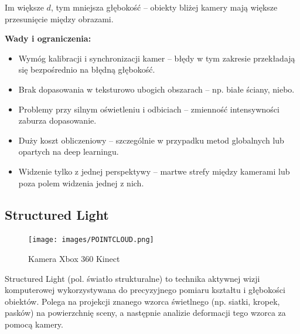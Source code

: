 \documentclass[magisterska]{pracadypl}
\begin{document}
Im większe $d$, tym mniejsza głębokość – obiekty bliżej kamery mają większe przesunięcie między obrazami.

\begin{minipage}[t]{\textwidth}
\textbf{Wady i ograniczenia:}
\begin{itemize}
  \item Wymóg kalibracji i synchronizacji kamer – błędy w tym zakresie przekładają się bezpośrednio na błędną głębokość.

  \item Brak dopasowania w teksturowo ubogich obszarach – np. białe ściany, niebo.

  \item Problemy przy silnym oświetleniu i odbiciach – zmienność intensywności zaburza dopasowanie.

  \item Duży koszt obliczeniowy – szczególnie w przypadku metod globalnych lub opartych na deep learningu.

  \item Widzenie tylko z jednej perspektywy – martwe strefy między kamerami lub poza polem widzenia jednej z nich.
\end{itemize}
\end{minipage}

\subsection{Structured Light}

\begin{figure}[H]  %
    \centering  %
    \texttt{[image: images/POINTCLOUD.png]}  %
    \captionsetup{font=footnotesize}
    \caption[Kamera Xbox 360 Kinect. https://cell-kom.com/inne/21454-kamera-internetowa-full-hd-b16-1080p-5900217390350.html]{Kamera Xbox 360 Kinect}
    \label{fig:kinect}  %
\end{figure}

Structured Light (pol. światło strukturalne) to technika aktywnej wizji komputerowej wykorzystywana do precyzyjnego pomiaru kształtu i głębokości obiektów. Polega na projekcji znanego wzorca świetlnego (np. siatki, kropek, pasków) na powierzchnię sceny, a następnie analizie deformacji tego wzorca za pomocą kamery.

\bigskip
\end{document}
